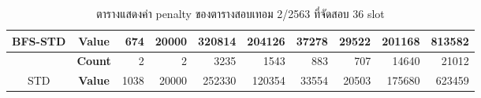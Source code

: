 \begin{table}[]
{\begin{tabular}{@{}ccrrrrrrrr@{}}
    \multirow{-2}{*}{BFS-STD}                    & \textbf{Value}                        & 674                            & 20000                          & 320814                         & 204126                         & 37278                          & 29522                          & 201168                         & 813582                           \\ \midrule
                                                  & {\textbf{Count}} & {2}       & {2}       & {3235}    & {1543}    & {883}     & {707}     & {14640}   & {21012}     \\ \cmidrule(l){2-10} 
    \multirow{-2}{*}{STD} & {\textbf{Value}} & {1038}    & {20000}   & {252330}  & {120354}  & {33554}   & {20503}   & {175680}  & {623459}    \\ \bottomrule
    \end{tabular}%
    }
    \caption{ตารางแสดงค่า penalty ของตารางสอบเทอม 2/2563 ที่จัดสอบ 36 slot}
    \label{tab:result_table_263_36}
\end{table}
